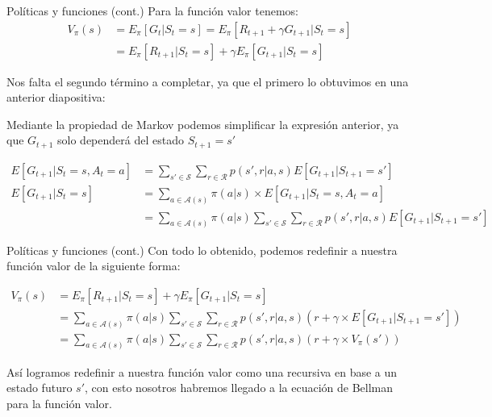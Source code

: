 \documentclass[10pt]{beamer}
\begin{document}
		\begin{frame}{Políticas y funciones (cont.)}
			Para la función valor tenemos:
			\[
			\begin{aligned}
			V_{\pi}(s) &= E_{\pi}\left[G_t | S_t = s\right] = E_{\pi}\left[R_{t+1} + \gamma G_{t+1} | S_t = s\right] \\	
			&= E_{\pi}\left[R_{t+1} | S_t = s \right] + \gamma E_{\pi}\left[G_{t+1} | S_t=s\right]
			\end{aligned}
			\]
			
			Nos falta el segundo término a completar, ya que el primero lo obtuvimos en una anterior diapositiva:

			\vspace{0.2 cm}

			
			\vspace{0.2 cm}
			Mediante la propiedad de Markov podemos simplificar la expresión anterior, ya que $G_{t+1}$ solo dependerá del estado $S_{t+1} = s'$

			\[
				\begin{aligned}
					E[G_{t+1} | S_t = s, A_t = a] &= \sum_{s' \in \mathcal{S}} \sum_{r \in \mathcal{R}} p(s', r | a, s)  E[G_{t+1} | S_{t+1} = s'] \\
					E[G_{t+1} | S_t = s] &= \sum_{a \in \mathcal{A}(s)} \pi(a | s) \times E[G_{t+1} | S_t = s, A_t = a]  \\
					&= \sum_{a \in \mathcal{A}(s)} \pi(a | s) \sum_{s' \in \mathcal{S}} \sum_{r \in \mathcal{R}} p(s', r | a, s) E[G_{t+1} | S_{t+1} = s']
				\end{aligned}
			\]
		\end{frame}

		\begin{frame}{Políticas y funciones (cont.)}
			Con todo lo obtenido, podemos redefinir a nuestra función valor de la siguiente forma:
			
			\[
			\begin{aligned}
				V_{\pi}(s) &= E_{\pi}\left[R_{t+1} | S_t = s \right] + \gamma E_{\pi}\left[G_{t+1} | S_t=s\right] \\
				&= \sum_{a \in \mathcal{A}(s)} \pi(a | s) \sum_{s' \in \mathcal{S}} \sum_{r \in \mathcal{R}} p(s', r | a, s) \left(r + \gamma \times E[G_{t+1} | S_{t+1} = s'] \right) \\
				&= \sum_{a \in \mathcal{A}(s)} \pi(a | s) \sum_{s' \in \mathcal{S}} \sum_{r \in \mathcal{R}} p(s', r | a, s) \left(r + \gamma \times V_{\pi}(s') \right)			
			\end{aligned}
			\]

			Así logramos redefinir a nuestra función valor como una recursiva en base a un estado futuro $s'$, con esto nosotros habremos llegado a la ecuación de Bellman para la función valor.
		\end{frame}
\end{document}
